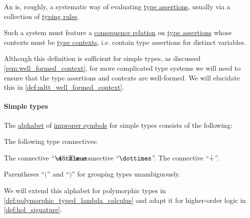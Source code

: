 \begin{definition}\label{def:abstract_type_system}\mimprovised
  An  is, roughly, a systematic way of evaluating \hyperref[def:type_assertion]{type assertions}, usually via a collection of \hyperref[con:typing_rule]{typing rules}.

  Such a system must feature a \hyperref[def:consequence_relation]{consequence relation} on \hyperref[def:type_assertion]{type assertions} whose contexts must be \hyperref[def:type_context]{type contexts}, i.e. contain type assertions for distinct variables.
\end{definition}
\begin{comments}
  \item Although this definition is sufficient for simple types, as discussed \cref{rem:well_formed_context}, for more complicated type systems we will need to ensure that the type assertions and contexts are well-formed. We will elucidate this in \cref{def:mltt_well_formed_context}.
\end{comments}

\paragraph{Simple types}

\begin{definition}\label{def:simple_type_alphabet}\mimprovised
  The \hyperref[def:formal_language/alphabet]{alphabet} of \hyperref[con:improper_symbol]{improper symbols} for simple types consists of the following:

  \begin{thmenum}
     The following type connectives:
    \begin{thmenum}
       The  connective \enquote{\( \synimplies \)}.
       The  connective \enquote{\( \syntimes \)}.
       The  connective \enquote{\( \mathbin{\dotplus} \)}.
    \end{thmenum}

     Parentheses \enquote{\( ( \)} and \enquote{\( ) \)} for grouping types unambiguously.
  \end{thmenum}
\end{definition}
\begin{comments}
  \item We will extend this alphabet for polymorphic types in \cref{def:polymorphic_typed_lambda_calculus} and adapt it for higher-order logic in \cref{def:hol_signature}.
\end{comments}

